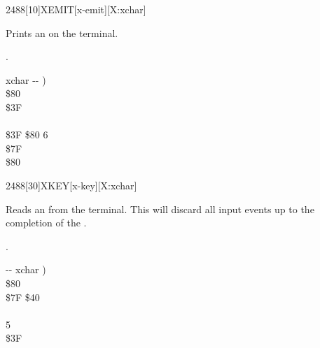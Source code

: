 \vspace*{-0.5ex}
\begin{worddef}{2488}[10]{XEMIT}[x-emit][X:xchar]
\item {}

	Prints an  on the terminal.

\see {}.

	\begin{implement}
	\word{:}   xchar -{}- ) \\
	\tab {} \$80        \\
	  \$3F \\
	\tab {}    \\
	\tab[2]    \$3F  \$80   6   \\
	\tab {} \$7F    \\
	\tab {}  \$80      \\
	\word{;}
	\end{implement}
\end{worddef}


\vspace*{-0.5ex}
\begin{worddef}{2488}[30]{XKEY}[x-key][X:xchar]
\item {}

	Reads an  from the terminal.  This will discard all input
	events up to the completion of the \param{xchar}.

\see {}.

	\begin{implement}
	\word{:}   -{}- xchar ) \\
	\tab {}  \$80       \\
	\tab \$7F  \$40  \\
	\tab {}       \\
	   5     \\
	\tab[2] \$3F    \\
	\tab {}   \word{;}
	\end{implement}
\end{worddef}


